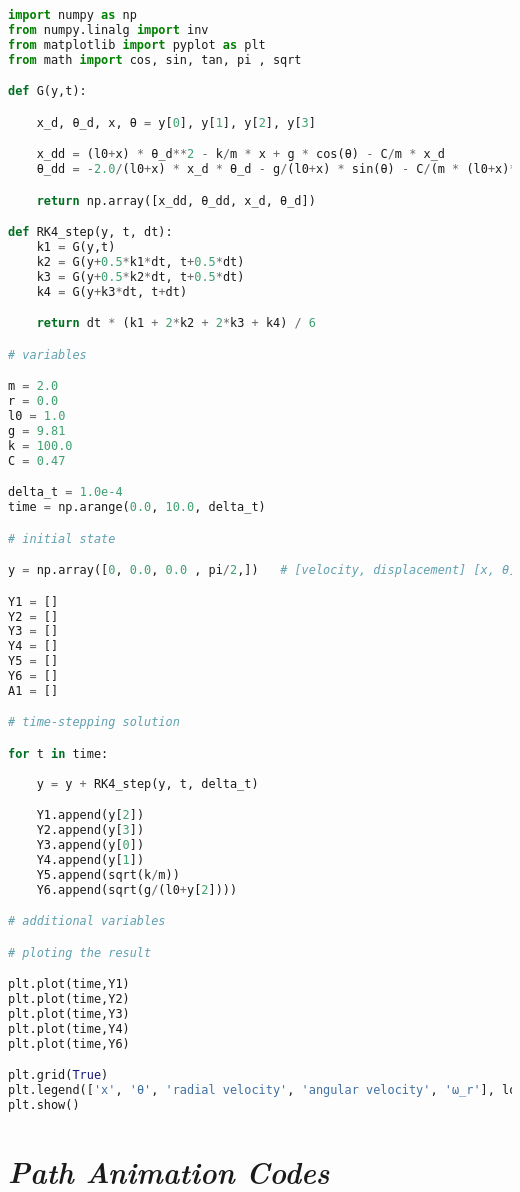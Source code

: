         \clearpage
        
        \begin{lstlisting}[language=Python, caption=\textit{Graphical Solution Python Script for system \textbf{with} Damping}]
import numpy as np 
from numpy.linalg import inv
from matplotlib import pyplot as plt
from math import cos, sin, tan, pi , sqrt

def G(y,t): 	

    x_d, θ_d, x, θ = y[0], y[1], y[2], y[3]

	x_dd = (l0+x) * θ_d**2 - k/m * x + g * cos(θ) - C/m * x_d	
	θ_dd = -2.0/(l0+x) * x_d * θ_d - g/(l0+x) * sin(θ) - C/(m * (l0+x)**2) * θ_d	

	return np.array([x_dd, θ_dd, x_d, θ_d])

def RK4_step(y, t, dt):
	k1 = G(y,t)
	k2 = G(y+0.5*k1*dt, t+0.5*dt)
	k3 = G(y+0.5*k2*dt, t+0.5*dt)
	k4 = G(y+k3*dt, t+dt)

	return dt * (k1 + 2*k2 + 2*k3 + k4) / 6

# variables

m = 2.0
r = 0.0
l0 = 1.0
g = 9.81
k = 100.0
C = 0.47

delta_t = 1.0e-4
time = np.arange(0.0, 10.0, delta_t)

# initial state

y = np.array([0, 0.0, 0.0 , pi/2,])   # [velocity, displacement] [x, θ] 

Y1 = []
Y2 = []
Y3 = []
Y4 = []
Y5 = []
Y6 = []
A1 = []

# time-stepping solution

for t in time:
	
	y = y + RK4_step(y, t, delta_t) 

	Y1.append(y[2])
	Y2.append(y[3])
	Y3.append(y[0])
	Y4.append(y[1])
	Y5.append(sqrt(k/m))
	Y6.append(sqrt(g/(l0+y[2])))

# additional variables

# ploting the result

plt.plot(time,Y1)
plt.plot(time,Y2)
plt.plot(time,Y3)
plt.plot(time,Y4)
plt.plot(time,Y6)

plt.grid(True)
plt.legend(['x', 'θ', 'radial velocity', 'angular velocity', 'ω_r'], loc='lower right')
plt.show()

\end{lstlisting}
        
\clearpage
        
    \section{\textit{Path Animation Codes}}
        
